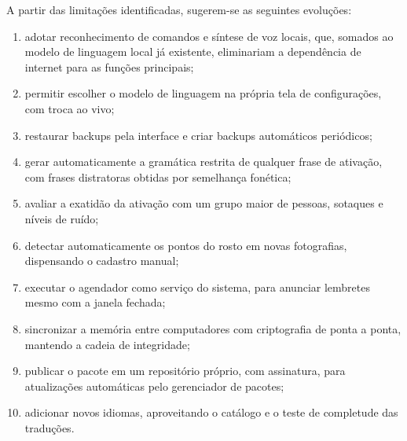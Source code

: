 A partir das limitações identificadas, sugerem-se as seguintes evoluções:
\begin{enumerate}[label=\alph*)]
  \item adotar reconhecimento de comandos e síntese de voz locais, que, somados ao modelo de linguagem
        local já existente, eliminariam a dependência de internet para as funções principais;
  \item permitir escolher o modelo de linguagem na própria tela de configurações, com troca ao vivo;
  \item restaurar backups pela interface e criar backups automáticos periódicos;
  \item gerar automaticamente a gramática restrita de qualquer frase de ativação, com frases distratoras
        obtidas por semelhança fonética;
  \item avaliar a exatidão da ativação com um grupo maior de pessoas, sotaques e níveis de ruído;
  \item detectar automaticamente os pontos do rosto em novas fotografias, dispensando o cadastro manual;
  \item executar o agendador como serviço do sistema, para anunciar lembretes mesmo com a janela fechada;
  \item sincronizar a memória entre computadores com criptografia de ponta a ponta, mantendo a cadeia de
        integridade;
  \item publicar o pacote em um repositório próprio, com assinatura, para atualizações automáticas pelo
        gerenciador de pacotes;
  \item adicionar novos idiomas, aproveitando o catálogo e o teste de completude das traduções.
\end{enumerate}
